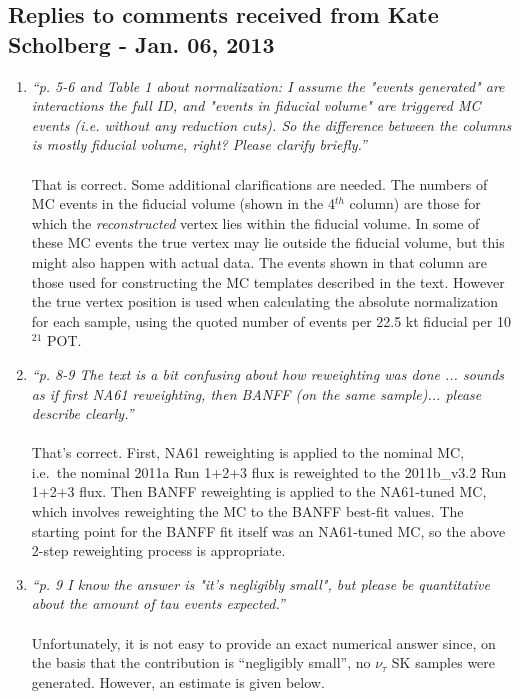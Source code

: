 \subsection{
  Replies to comments received from Kate Scholberg - Jan. 06, 2013 }

\begin{enumerate}

\vspace{5 mm}
\item
{\em
  ``p. 5-6 and Table 1  about normalization: 
  I assume the "events generated" are interactions the full ID, and "events in 
  fiducial volume" are triggered MC events (i.e. without any reduction cuts).  
  So the difference between the columns is mostly fiducial volume, right?  
  Please clarify briefly.''
}\\
\\
That is correct. 
Some additional clarifications are needed. 
The numbers of MC events in the fiducial volume (shown in the 4$^{th}$ column) are those for which the
{\em reconstructed} vertex lies within the fiducial volume.
In some of these MC events the true vertex may lie outside the fiducial volume, but this 
might also happen with actual data.
The events shown in that column are those used for constructing the MC templates described in the text.
However the true vertex position is used when calculating the absolute normalization for each sample,
using the quoted number of events per 22.5 kt fiducial per 10$^{21}$ POT.

\vspace{5 mm}
\item
{\em
  ``p. 8-9 The text is a bit confusing about how reweighting was done ... 
  sounds as if first NA61 reweighting, then BANFF (on the same sample)... 
  please describe clearly.''
}\\
\\
That's correct. First, NA61 reweighting is applied to the nominal MC, i.e.\ 
the nominal 2011a Run 1+2+3 flux is reweighted to the 2011b\_v3.2 Run 1+2+3 flux.
Then BANFF reweighting is applied to the NA61-tuned MC, which involves reweighting the MC
to the BANFF best-fit values.
The starting point for the BANFF fit itself was an NA61-tuned MC, so the above 
2-step reweighting process is appropriate.	

\vspace{5 mm}
\item
{\em
  ``p. 9  I know the answer is "it's negligibly small", 
  but please be quantitative about the amount of tau events expected.''
}\\
\\
Unfortunately, it is not easy to provide an exact numerical answer since, on the basis that 
the contribution is ``negligibly small'', no $\nu_{\tau}$ SK samples were generated.
However, an estimate is given below.


\end{enumerate}
